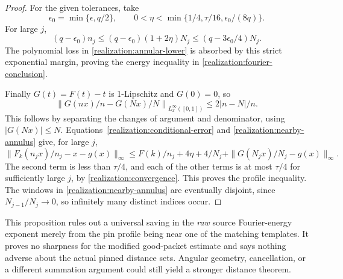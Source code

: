 \begin{proof}
For the given tolerances, take
\[
 \epsilon_0=\min\{\epsilon,q/2\},\qquad
 0<\eta<\min\{1/4,\tau/16,\epsilon_0/(8q)\}.
\]
For large \(j\),
\[
 (q-\epsilon_0)n_j
 \le(q-\epsilon_0)(1+2\eta)N_j
 \le(q-3\epsilon_0/4)N_j.
\]
The polynomial loss in \eqref{realization:annular-lower} is absorbed by
this strict exponential margin, proving the energy inequality in
\eqref{realization:fourier-conclusion}.

Finally \(G(t)=F(t)-t\) is 1-Lipschitz and \(G(0)=0\), so
\[
 \left\|G(nx)/n-G(Nx)/N\right\|_{L^\infty_x([0,1])}
 \le2|n-N|/n.
\]
This follows by separating the changes of argument and denominator, using
\(|G(Nx)|\le N\). Equations~\eqref{realization:conditional-error}
and \eqref{realization:nearby-annulus} give, for large \(j\),
\[
 \|F_k(n_jx)/n_j-x-g(x)\|_\infty
 \le F(k)/n_j+4\eta+4/N_j+
       \|G(N_jx)/N_j-g(x)\|_\infty.
\]
The second term is less than \(\tau/4\), and each of the other terms
is at most \(\tau/4\) for sufficiently large \(j\), by
\eqref{realization:convergence}. This proves the profile inequality.
The windows in \eqref{realization:nearby-annulus} are eventually disjoint,
since \(N_{j-1}/N_j\to0\), so infinitely many distinct indices occur.
\end{proof}

This proposition rules out a universal saving in the \emph{raw} source
Fourier-energy exponent merely from the pin profile being near one of the
matching templates. It proves no sharpness for the modified good-packet
estimate and says nothing adverse about the actual pinned distance sets.
Angular geometry, cancellation, or a different summation argument could
still yield a stronger distance theorem.
